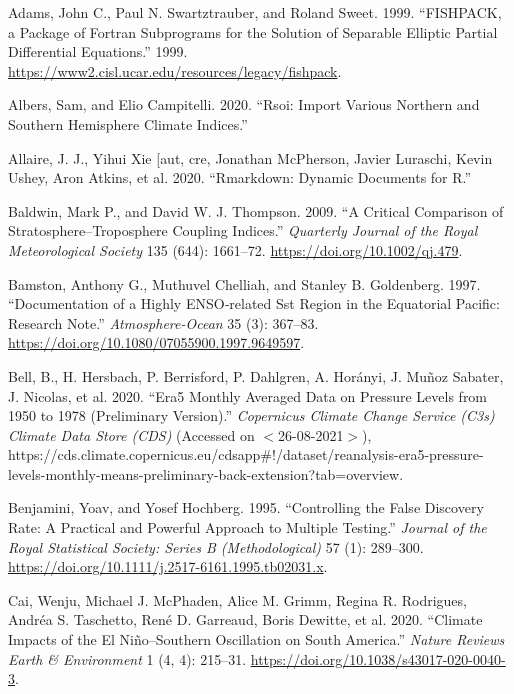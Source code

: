 \documentclass[smallextended]{svjour3}       %
\newlength{\cslhangindent}
\newlength{\cslentryspacingunit} %
\newenvironment{CSLReferences}[2] %
 {%
  \setlength{\parindent}{0pt}
  \ifodd #1
  \let\oldpar\par
  \def\par{\hangindent=\cslhangindent\oldpar}
  \fi
  \setlength{\parskip}{#2\cslentryspacingunit}
 }%
 {}
\begin{document}
\hypertarget{refs}{}
\begin{CSLReferences}{1}{0}
\leavevmode{}%
Adams, John C., Paul N. Swartztrauber, and Roland Sweet. 1999. {``{FISHPACK}, a Package of {Fortran} Subprograms for the Solution of Separable Elliptic Partial Differential Equations.''} 1999. \url{https://www2.cisl.ucar.edu/resources/legacy/fishpack}.

\leavevmode{}%
Albers, Sam, and Elio Campitelli. 2020. {``Rsoi: {Import Various Northern} and {Southern Hemisphere Climate Indices}.''}

\leavevmode{}%
Allaire, J. J., Yihui Xie {[}aut, cre, Jonathan McPherson, Javier Luraschi, Kevin Ushey, Aron Atkins, et al. 2020. {``Rmarkdown: {Dynamic Documents} for {R}.''}

\leavevmode{}%
Baldwin, Mark P., and David W. J. Thompson. 2009. {``A Critical Comparison of Stratosphere--Troposphere Coupling Indices.''} \emph{Quarterly Journal of the Royal Meteorological Society} 135 (644): 1661--72. \url{https://doi.org/10.1002/qj.479}.

\leavevmode{}%
Bamston, Anthony G., Muthuvel Chelliah, and Stanley B. Goldenberg. 1997. {``Documentation of a Highly {ENSO}‐related Sst Region in the Equatorial Pacific: {Research} Note.''} \emph{Atmosphere-Ocean} 35 (3): 367--83. \url{https://doi.org/10.1080/07055900.1997.9649597}.

\leavevmode{}%
Bell, B., H. Hersbach, P. Berrisford, P. Dahlgren, A. Horányi, J. Muñoz Sabater, J. Nicolas, et al. 2020. {``{Era5} Monthly Averaged Data on Pressure Levels from 1950 to 1978 (Preliminary Version).''} \emph{{Copernicus Climate Change Service} ({C3s}) {Climate Data Store} ({CDS})} (Accessed on {\(<\)}26-08-2021{\(>\)}), https://cds.climate.copernicus.eu/cdsapp\#!/dataset/reanalysis-era5-pressure-levels-monthly-means-preliminary-back-extension?tab=overview.

\leavevmode{}%
Benjamini, Yoav, and Yosef Hochberg. 1995. {``Controlling the {False Discovery Rate}: {A Practical} and {Powerful Approach} to {Multiple Testing}.''} \emph{Journal of the Royal Statistical Society: Series B (Methodological)} 57 (1): 289--300. \url{https://doi.org/10.1111/j.2517-6161.1995.tb02031.x}.

\leavevmode{}%
Cai, Wenju, Michael J. McPhaden, Alice M. Grimm, Regina R. Rodrigues, Andréa S. Taschetto, René D. Garreaud, Boris Dewitte, et al. 2020. {``Climate Impacts of the {El Niño}--{Southern Oscillation} on {South America}.''} \emph{Nature Reviews Earth \& Environment} 1 (4, 4): 215--31. \url{https://doi.org/10.1038/s43017-020-0040-3}.


\end{CSLReferences}
\end{document}
